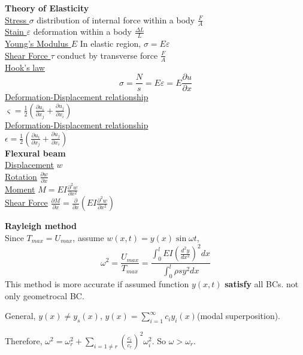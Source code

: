 \documentclass{article}
\begin{document}
\begin{multicols}{3}
\noindent\textbf{Theory of Elasticity}\\
\underline{Stress $\sigma$} distribution of internal force within a body $\frac{F}{A}$\\
\underline{Stain $\varepsilon$} deformation within a body $\frac{\Delta L}{L}$\\
\underline{Young's Modulus $E$} In elastic region, $\sigma = E\varepsilon$\\
\underline{Shear Force $\tau$} conduct by transverse force $\frac{F}{A}$\\
\underline{Hook's law}
  \begin{equation*}
    \sigma=\frac{N}{s}=E\varepsilon=E\frac{\partial u}{\partial x}
  \end{equation*}
\underline{Deformation-Displacement relationship}\\
  $\varsigma=\frac{1}{2}(\frac{\partial u_{i}}{\partial x_{j}}+\frac{\partial u_{j}}{\partial x_{i}})$\\

\underline{Deformation-Displacement relationship}\\
  $\epsilon = \frac{1}{2}(\frac{\partial u_{i}}{\partial x_{j}}+\frac{\partial u_{j}}{\partial x_{i}})$\\

  \noindent\textbf{Flexural beam}\\
  \underline{Displacement} $w$\\
  \underline{Rotation} $\frac{\partial w}{\partial x}$\\
  \underline{Moment} $M=EI\frac{\partial^{2} w}{\partial x^{2}}$\\
  \underline{Shear Force} $\frac{\partial M}{\partial x}=\frac{\partial }{\partial x}(EI \frac{\partial^{2}w}{\partial x^{2}})$

  \noindent\textbf{Rayleigh method}\\
  Since $T_{max} = U_{max}$, assume $w(x,t) = y(x) \sin\omega t$,
      \begin{equation*}
        \omega^2 =\frac{U_{max}}{T_{max}}=\frac{\int_0^l EI(\frac{d^2y}{dx^2})^2 dx}{\int_0^l \rho s y^2 dx}
      \end{equation*}
  This method is more accurate if assumed function $y(x,t)$ \textbf{satisfy} all BCs. not only geometrocal BC.

  General, $y(x)\neq y_{s}(x)$,  $y(x)=\sum_{i=1}^{\infty}c_{i}y_{i}(x)$(modal superposition).
  
  Therefore, $\omega^{2}=\omega^{2}_{r}+\sum_{i=1\neq r}(\frac{c_{i}}{c_{r}})^{2}\omega_{i}^{2}$. So $\omega>\omega_{r}$.
  

\end{multicols}
\end{document}
